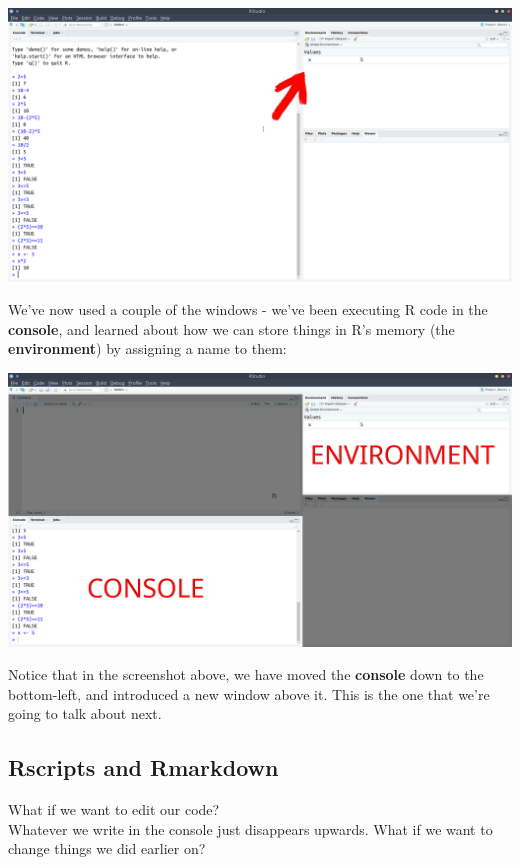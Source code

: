 \documentclass[]{book}
\begin{document}
\includegraphics{images/installing_intro/rassign.png}

We've now used a couple of the windows - we've been executing R code in the \textbf{console}, and learned about how we can store things in R's memory (the \textbf{environment}) by assigning a name to them:

\includegraphics{images/installing_intro/r4panel2.png}

Notice that in the screenshot above, we have moved the \textbf{console} down to the bottom-left, and introduced a new window above it. This is the one that we're going to talk about next.

\hypertarget{rscripts-and-rmarkdown}{%
\subsection*{Rscripts and Rmarkdown}\label{rscripts-and-rmarkdown}}

What if we want to edit our code?\\
Whatever we write in the console just disappears upwards. What if we want to change things we did earlier on?
\end{document}
